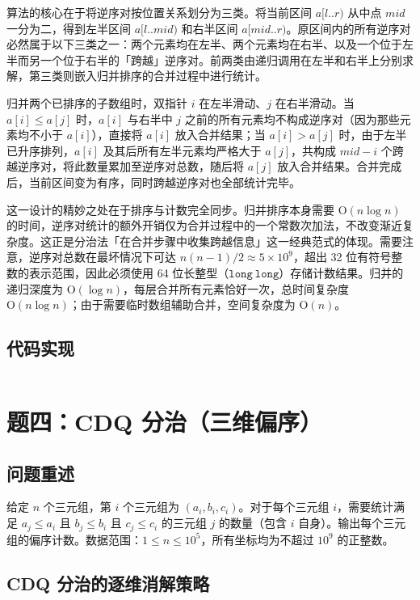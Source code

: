 \documentclass[12pt, a4paper]{academics}
\begin{document}
算法的核心在于将逆序对按位置关系划分为三类。将当前区间 $a[l..r)$ 从中点 $\mathit{mid}$ 一分为二，得到左半区间 $a[l..\mathit{mid})$ 和右半区间 $a[\mathit{mid}..r)$。原区间内的所有逆序对必然属于以下三类之一：两个元素均在左半、两个元素均在右半、以及一个位于左半而另一个位于右半的「跨越」逆序对。前两类由递归调用在左半和右半上分别求解，第三类则嵌入归并排序的合并过程中进行统计。

归并两个已排序的子数组时，双指针 $i$ 在左半滑动、$j$ 在右半滑动。当 $a[i] \le a[j]$ 时，$a[i]$ 与右半中 $j$ 之前的所有元素均不构成逆序对（因为那些元素均不小于 $a[i]$），直接将 $a[i]$ 放入合并结果；当 $a[i] > a[j]$ 时，由于左半已升序排列，$a[i]$ 及其后所有左半元素均严格大于 $a[j]$，共构成 $\mathit{mid} - i$ 个跨越逆序对，将此数量累加至逆序对总数，随后将 $a[j]$ 放入合并结果。合并完成后，当前区间变为有序，同时跨越逆序对也全部统计完毕。

这一设计的精妙之处在于排序与计数完全同步。归并排序本身需要 $\mathrm{O}(n \log n)$ 的时间，逆序对统计的额外开销仅为合并过程中的一个常数次加法，不改变渐近复杂度。这正是分治法「在合并步骤中收集跨越信息」这一经典范式的体现。需要注意，逆序对总数在最坏情况下可达 $n(n-1)/2 \approx 5 \times 10^9$，超出 32 位有符号整数的表示范围，因此必须使用 64 位长整型（$\mathtt{long\ long}$）存储计数结果。归并的递归深度为 $\mathrm{O}(\log n)$，每层合并所有元素恰好一次，总时间复杂度 $\mathrm{O}(n \log n)$；由于需要临时数组辅助合并，空间复杂度为 $\mathrm{O}(n)$。

\subsection{代码实现}

\inputminted{c++}{../src/p3_inversions.cpp}

\section{题四：CDQ 分治（三维偏序）}

\subsection{问题重述}

给定 $n$ 个三元组，第 $i$ 个三元组为 $(a_i, b_i, c_i)$。对于每个三元组 $i$，需要统计满足 $a_j \le a_i$ 且 $b_j \le b_i$ 且 $c_j \le c_i$ 的三元组 $j$ 的数量（包含 $i$ 自身）。输出每个三元组的偏序计数。数据范围：$1 \le n \le 10^5$，所有坐标均为不超过 $10^9$ 的正整数。

\subsection{CDQ 分治的逐维消解策略}
\end{document}
